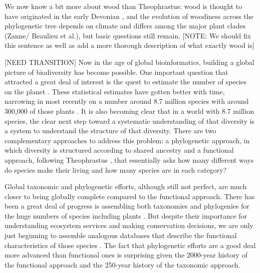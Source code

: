 \documentclass[12pt]{article}
\begin{document}
We now know a bit more about wood than Theophrastus: wood is thought to have originated in the early Devonian \citep[~400 mya;][]{gerrienne2011simple}, and the evolution of woodiness across the phylogenetic tree depends on climate and differs among the major plant clades (Zanne/ Beaulieu et al.), but basic questions still remain. [NOTE: We should fix this sentence as well as add a more thorough description of what exactly wood is]

[NEED TRANSITION] Now in the age of global bioinformatics, building a global picture of biodiversity has become possible.  One important question that attracted a great deal of interest is the quest to estimate the number of species on the planet \citep{may1988many,erwin1991many, stork1993many, mora2011plos}.  These statistical estimates have gotten better with time, narrowing in most recently on a number around 8.7 million species with around 300,000 of those plants \citep{mora2011plos}.  It is also becoming clear that in a world with 8.7 million species, the clear next step toward a systematic understanding of that diversity is a system to understand the structure of that diversity. There are two complementary approaches to address this problem: a phylogenetic approach, in which diversity is structured according to shared ancestry and a functional approach, following Theophrastus \citep[more recently in the tradition of][]{grime1979plant, weiher2009challenging, westoby2002plant}, that essentially asks how many different ways do species make their living and how many species are in each category?

Global taxonomic and phylogenetic efforts, although still not perfect, are much closer to being globally complete compared to the functional approach.   There has been a great deal of progress is assembling both taxonomies and phylogenies for the huge numbers of species including plants \citep[e.g.][]{smith2011understanding}. But despite their importance for understanding ecosystem services and making conservation decisions, we are only just beginning to assemble analogous databases that describe the functional characteristics of those species \citep{Kattge2011TRY}. The fact that phylogenetic efforts are a good deal more advanced than functional ones is surprising given the 2000-year history of the functional approach and the 250-year history of the taxonomic approach.  

\end{document}
